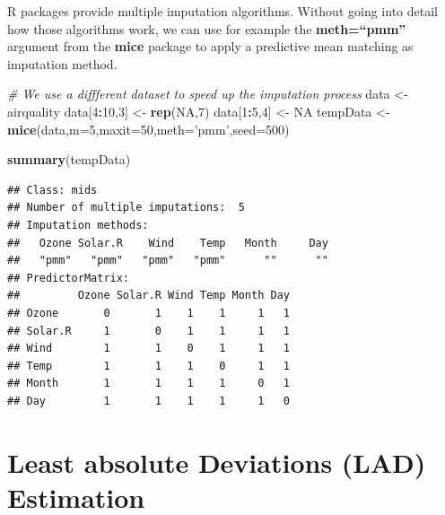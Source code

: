 \documentclass[]{book}
\newenvironment{Shaded}{\begin{snugshade}}{\end{snugshade}}
\newcommand{\CommentTok}[1]{\textcolor[rgb]{0.56,0.35,0.01}{\textit{#1}}}
\newcommand{\DataTypeTok}[1]{\textcolor[rgb]{0.13,0.29,0.53}{#1}}
\newcommand{\DecValTok}[1]{\textcolor[rgb]{0.00,0.00,0.81}{#1}}
\newcommand{\KeywordTok}[1]{\textcolor[rgb]{0.13,0.29,0.53}{\textbf{#1}}}
\newcommand{\NormalTok}[1]{#1}
\newcommand{\OperatorTok}[1]{\textcolor[rgb]{0.81,0.36,0.00}{\textbf{#1}}}
\newcommand{\OtherTok}[1]{\textcolor[rgb]{0.56,0.35,0.01}{#1}}
\newcommand{\StringTok}[1]{\textcolor[rgb]{0.31,0.60,0.02}{#1}}
\begin{document}
R packages provide multiple imputation algorithms. Without going into
detail how those algorithms work, we can use for example the
\textbf{meth=``pmm''} argument from the \textbf{mice} package to apply a
predictive mean matching as imputation method.

\begin{Shaded}
\begin{Highlighting}[]
\CommentTok{# We use a diffferent dataset to speed up the imputation process}
\NormalTok{data <-}\StringTok{ }\NormalTok{airquality}
\NormalTok{data[}\DecValTok{4}\OperatorTok{:}\DecValTok{10}\NormalTok{,}\DecValTok{3}\NormalTok{] <-}\StringTok{ }\KeywordTok{rep}\NormalTok{(}\OtherTok{NA}\NormalTok{,}\DecValTok{7}\NormalTok{)}
\NormalTok{data[}\DecValTok{1}\OperatorTok{:}\DecValTok{5}\NormalTok{,}\DecValTok{4}\NormalTok{] <-}\StringTok{ }\OtherTok{NA}
\NormalTok{tempData <-}\StringTok{ }\KeywordTok{mice}\NormalTok{(data,}\DataTypeTok{m=}\DecValTok{5}\NormalTok{,}\DataTypeTok{maxit=}\DecValTok{50}\NormalTok{,}\DataTypeTok{meth=}\StringTok{'pmm'}\NormalTok{,}\DataTypeTok{seed=}\DecValTok{500}\NormalTok{)}
\end{Highlighting}
\end{Shaded}

\begin{Shaded}
\begin{Highlighting}[]
\KeywordTok{summary}\NormalTok{(tempData)}
\end{Highlighting}
\end{Shaded}

\begin{verbatim}
## Class: mids
## Number of multiple imputations:  5 
## Imputation methods:
##   Ozone Solar.R    Wind    Temp   Month     Day 
##   "pmm"   "pmm"   "pmm"   "pmm"      ""      "" 
## PredictorMatrix:
##         Ozone Solar.R Wind Temp Month Day
## Ozone       0       1    1    1     1   1
## Solar.R     1       0    1    1     1   1
## Wind        1       1    0    1     1   1
## Temp        1       1    1    0     1   1
## Month       1       1    1    1     0   1
## Day         1       1    1    1     1   0
\end{verbatim}

\hypertarget{least-absolute-deviations-lad-estimation}{%
\section{Least absolute Deviations (LAD)
Estimation}\label{least-absolute-deviations-lad-estimation}}
\end{document}
